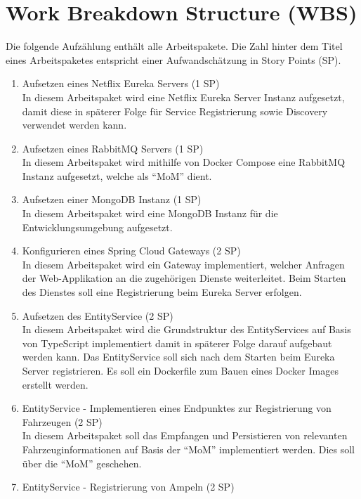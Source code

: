 \section{Work Breakdown Structure (WBS)}

Die folgende Aufzählung enthält alle Arbeitspakete.
Die Zahl hinter dem Titel eines Arbeitspaketes entspricht einer Aufwandschätzung in Story Points (SP).

\begin{enumerate}
  \item Aufsetzen eines Netflix Eureka Servers (1 SP)\\
  		In diesem Arbeitspaket wird eine Netflix Eureka Server Instanz aufgesetzt, damit diese in späterer Folge für Service Registrierung sowie Discovery verwendet werden kann.
  \item Aufsetzen eines RabbitMQ Servers (1 SP)\\
  		In diesem Arbeitspaket wird mithilfe von Docker Compose eine RabbitMQ Instanz aufgesetzt, welche als \enquote{MoM} dient.
  \item Aufsetzen einer MongoDB Instanz (1 SP)\\
  		In diesem Arbeitspaket wird eine MongoDB Instanz für die Entwicklungsumgebung aufgesetzt.
  \item Konfigurieren eines Spring Cloud Gateways (2 SP)\\
  		In diesem Arbeitspaket wird ein Gateway implementiert, welcher Anfragen der Web-Applikation an die zugehörigen Dienste weiterleitet.
  		Beim Starten des Dienstes soll eine Registrierung beim Eureka Server erfolgen.
  \item Aufsetzen des EntityService (2 SP)\\
  		In diesem Arbeitspaket wird die Grundstruktur des EntityServices auf Basis von TypeScript implementiert damit in späterer Folge darauf aufgebaut werden kann.
  		Das EntityService soll sich nach dem Starten beim Eureka Server registrieren.
  		Es soll ein Dockerfile zum Bauen eines Docker Images erstellt werden.
  \item EntityService - Implementieren eines Endpunktes zur Registrierung von Fahrzeugen (2 SP)\\
  		In diesem Arbeitspaket soll das Empfangen und Persistieren von relevanten Fahrzeuginformationen auf Basis der \enquote{MoM} implementiert werden.
  		Dies soll über die \enquote{MoM} geschehen.
  \item EntityService - Registrierung von Ampeln (2 SP)\\

\end{enumerate}

